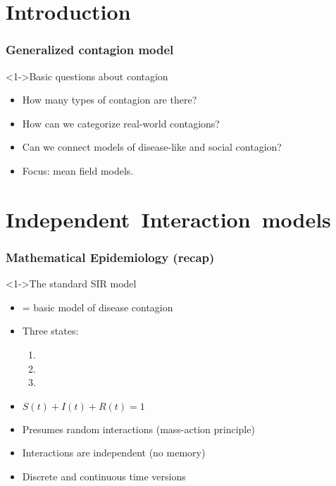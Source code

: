\section{Introduction}

\begin{frame}

  \frametitle{Generalized contagion model}

  \begin{block}<1->{Basic questions about contagion}
    \begin{itemize}
    \item<2-> How many types of contagion are there?
    \item<3-> How can we categorize real-world contagions?
    \item<4-> Can we connect models of disease-like and social contagion?
    \item<5-> \alert{Focus:} mean field models.
    \end{itemize}
  \end{block}

\end{frame}

\section{Independent\ Interaction\ models}

\begin{frame}
  \frametitle{Mathematical Epidemiology (recap)}

  \begin{block}<1->{The standard \alert{SIR model}\cite{murray2002a}}
    \begin{itemize}
    \item<2-> = basic model of disease contagion
    \item<3-> Three states:
      \begin{enumerate}
      \item<4-> 
      \item<5-> 
      \item<6-> 
      \end{enumerate}
      \item<8-> $S(t) + I(t) + R(t) = 1$
      \item<9-> Presumes random interactions (mass-action principle)
      \item<10-> Interactions are independent (no memory)
      \item<11-> Discrete and continuous time versions
    \end{itemize}
  \end{block}

\end{frame}


